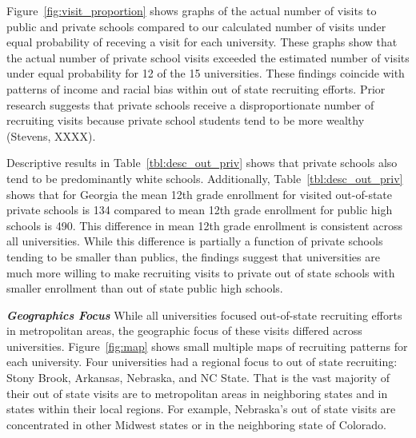 \documentclass[twoside]{article}
\begin{document}
Figure~\ref{fig:visit_proportion} shows graphs of the actual number of visits to public and private schools compared to our calculated number of visits under equal probability of receving a visit for each university. These graphs show that the actual number of private school visits exceeded the estimated number of visits under equal probability for 12 of the 15 universities. These findings coincide with patterns of income and racial bias within out of state recruiting efforts. Prior research suggests that private schools receive a disproportionate number of recruiting visits because private school students tend to be more wealthy (Stevens, XXXX).

Descriptive results in Table~\ref{tbl:desc_out_priv} shows that private schools also tend to be predominantly white schools. Additionally, Table~\ref{tbl:desc_out_priv} shows that for Georgia the mean 12th grade enrollment for visited out-of-state private schools is 134 compared to mean 12th grade enrollment for public high schools is 490. This difference in mean 12th grade enrollment is consistent across all universities. While this difference is partially a function of private schools tending to be smaller than publics, the findings suggest that universities are much more willing to make recruiting visits to private out of state schools with smaller enrollment than out of state public high schools.

\textbf{\textit{Geographics Focus}} While all universities focused out-of-state recruiting efforts in metropolitan areas, the geographic focus of these visits differed across universities. Figure~\ref{fig:map} shows small multiple maps of recruiting patterns for each university. Four universities had a regional focus to out of state recruiting: Stony Brook, Arkansas, Nebraska, and NC State. That is the vast majority of their out of state visits are to metropolitan areas in neighboring states and in states within their local regions. For example, Nebraska's out of state visits are concentrated in other Midwest states or in the neighboring state of Colorado.



\end{document}
